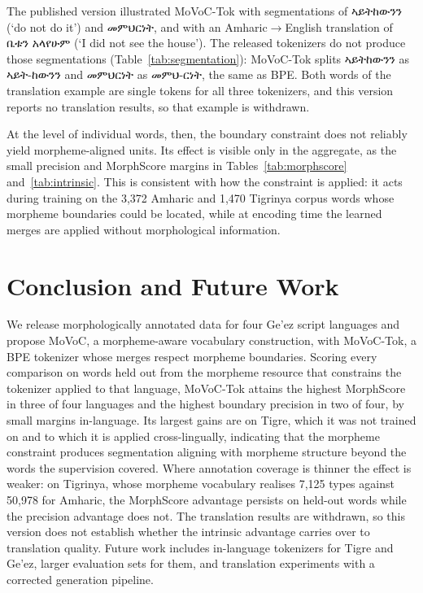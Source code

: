 \documentclass[11pt]{article}
\newcommand{\eth}[1]{{\ethiopicfont #1}}
\newcommand{\movoctok}{MoVoC-Tok}
\begin{document}
The published version illustrated \movoctok{} with segmentations of
\eth{ኣይትከውንን} (`do not do it') and \eth{መምህርነት}, and with an
Amharic$\rightarrow$English translation of \eth{ቤቱን} \eth{አላየሁም} (`I did not
see the house'). The released tokenizers do not produce those segmentations
(Table~\ref{tab:segmentation}): \movoctok{} splits \eth{ኣይትከውንን} as
\eth{ኣይት-ከውንን} and \eth{መምህርነት} as \eth{መምህ-ርነት}, the same as
BPE. Both words of the translation example are single tokens for all three
tokenizers, and this version reports no translation results, so that example
is withdrawn.

At the level of individual words, then, the boundary constraint does not
reliably yield morpheme-aligned units. Its effect is visible only in the
aggregate, as the small precision and MorphScore margins in
Tables~\ref{tab:morphscore} and~\ref{tab:intrinsic}. This is consistent with
how the constraint is applied: it acts during training on the 3,372 Amharic
and 1,470 Tigrinya corpus words whose morpheme boundaries could be located,
while at encoding time the learned merges are applied without morphological
information.

\section{Conclusion and Future Work}
\label{sec:conclusion}

We release morphologically annotated data for four Ge'ez script languages and
propose MoVoC, a morpheme-aware vocabulary construction, with \movoctok{}, a
BPE tokenizer whose merges respect morpheme boundaries. Scoring every
comparison on words held out from the morpheme resource that constrains the
tokenizer applied to that language, \movoctok{} attains the highest MorphScore in
three of four languages and the highest boundary precision in two of four, by
small margins in-language. Its largest gains are on Tigre, which it was not
trained on and to which it is applied cross-lingually, indicating that the
morpheme constraint produces segmentation aligning with morpheme structure
beyond the words the supervision covered. Where annotation coverage is thinner
the effect is weaker: on Tigrinya, whose morpheme vocabulary realises 7,125
types against 50,978 for Amharic, the MorphScore advantage persists on
held-out words while the precision advantage does not. The translation results
are withdrawn, so this version does not establish whether the intrinsic
advantage carries over to translation quality. Future work includes
in-language tokenizers for Tigre and Ge'ez, larger evaluation sets for them,
and translation experiments with a corrected generation pipeline.
\end{document}
